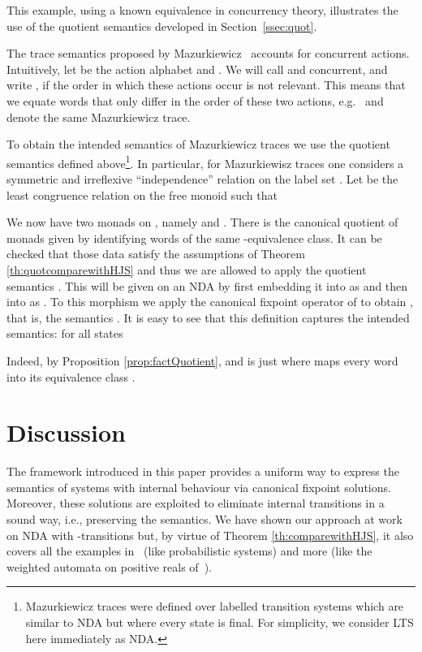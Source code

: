 \documentclass[oribibl,envcountsame,envcountsect,runningheads]{llncs}
\renewcommand{\>}{\rangle}
\begin{document}
\begin{example} \label{Sec:MazurTraces}
This example, using a known equivalence in concurrency theory, illustrates the use of the quotient semantics developed in Section~\ref{ssec:quot}.

The trace semantics proposed by Mazurkiewicz~\cite{Mazurkiewicz77} accounts for concurrent actions. Intuitively, let  be the action alphabet and . We will call  and  concurrent, and write , if the order in which these actions occur is not relevant. This means that we equate words that only differ in the order of these two actions, e.g.~ and  denote the same Mazurkiewicz trace.

To obtain the intended semantics of Mazurkiewicz traces we use the quotient semantics defined above\footnote{Mazurkiewicz traces were defined over labelled transition systems which are similar to NDA but where every state is final. For simplicity, we consider LTS here immediately as NDA.}. In particular, for Mazurkiewisz traces one considers a symmetric and irreflexive ``independence'' relation  on the label set . Let  be the least congruence relation on the free monoid  such that


We now have two monads on , namely  and . There is the canonical quotient of monads  given by identifying words of the same -equivalence class. It can be checked that those data satisfy the assumptions of Theorem \ref{th:quotcomparewithHJS} and thus we are allowed to apply the quotient semantics .
This will be given on an NDA  by first embedding it into  as  and then into  as .
To this morphism we apply the canonical fixpoint operator of  to obtain , that is, the semantics .
It is easy to see that this definition captures the intended semantics: for all states 

Indeed, by Proposition \ref{prop:factQuotient},  and  is just  where  maps every word  into its equivalence class .
\end{example}

\section{Discussion}\label{Sec:Discussion}
The framework introduced in this paper provides a uniform way to express the semantics of systems with internal behaviour via canonical fixpoint solutions. Moreover, these solutions are exploited to eliminate internal transitions in a sound way, i.e., preserving the semantics. We have shown our approach at work on NDA with -transitions but, by virtue of Theorem \ref{th:comparewithHJS}, it also covers all the examples in~\cite{HasuoJS:07} (like probabilistic systems) and more (like the weighted automata on positive reals of~\cite{SW13}).
\end{document}
